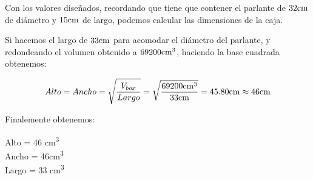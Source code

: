 Con los valores diseñados, recordando que tiene que contener el parlante de $32 \si[per-mode=symbol]{\centi\meter}$ de diámetro y $15 \si[per-mode=symbol]{\centi\meter}$ de largo, podemos calcular las dimensiones de la caja.

Si hacemos el largo de $33 \si[per-mode=symbol]{\centi\meter}$ para acomodar el diámetro del parlante, y redondeando el volumen obtenido a $69200 \si[per-mode=symbol]{\cubic\centi\meter}$, haciendo la base cuadrada obtenemos:


\begin{equation*}
Alto = Ancho = \sqrt{\frac{V_{box}}{Largo}} = \sqrt{\frac{69200 \si[per-mode=symbol]{\cubic\centi\meter}}{33 \si[per-mode=symbol]{\centi\meter}}} = 45.80 \si[per-mode=symbol]{\centi\meter} \approx 46 \si[per-mode=symbol]{\centi\meter}
\end{equation*}

Finalemente obtenemos:


\begin{mymathbox}[ams align*, title=Dimensiones de la caja (método de \textit{Thiele-Small}), colframe=EQColor!30!EQColor]
Alto = 46 \si[per-mode=symbol]{\cubic\centi\meter} \\
Ancho = 46\si[per-mode=symbol]{\cubic\centi\meter} \\
Largo = 33 \si[per-mode=symbol]{\cubic\centi\meter}
\end{mymathbox}



